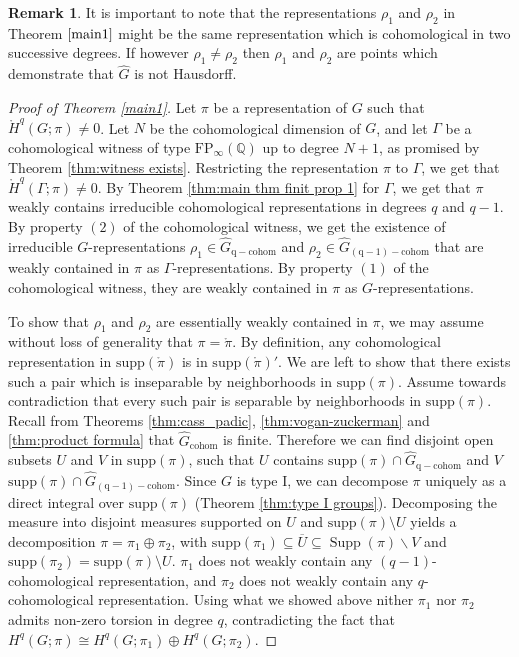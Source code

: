 \documentclass[12pt,reqno]{amsart}
\newcommand{\Q}{\mathbb{Q}}
\theoremstyle{definition}
\newtheorem{remark}[theorem]{Remark}
\newcommand{\supp}{\operatorname{Supp}}
\newcommand{\torH}{\mathring{H}}
\begin{document}
\begin{remark}
It is important to note that the representations $\rho_1$ and $\rho_2$ in Theorem $\ref{main1}$ might be the same representation which is cohomological in two successive degrees. If however $\rho_1 \neq \rho_2$ then $\rho_1$ and $\rho_2$ are points which demonstrate that $\widehat{G}$ is not Hausdorff. 
\end{remark}
\begin{proof}[Proof of Theorem \ref{main1}]
Let $\pi$ be a representation of $G$ such that $\torH^q(G;\pi) \ne 0$. Let $N$ be the cohomological dimension of $G$, and let $\Gamma$ be a cohomological witness of type $\mathrm{FP}_\infty(\Q)$ up to degree $N+1$, as promised by Theorem \ref{thm:witness exists}. Restricting the representation $\pi$ to $\Gamma$, we get that $\mathring{H}^q(\Gamma;\pi) \ne 0$. By Theorem \ref{thm:main thm finit prop 1} for $\Gamma$, we get that $\pi$ weakly contains irreducible cohomological representations in degrees $q$ and $q-1$. By property $(2)$ of the cohomological witness, we get the existence of irreducible $G$-representations $\rho_1\in \widehat{G}_{\mathrm{q-cohom}}$ and $\rho_2 \in \widehat{G}_{\mathrm{(q-1)-cohom}}$ that are weakly contained in $\pi$ as $\Gamma$-representations. By property $(1)$ of the cohomological witness, they are weakly contained in $\pi$ as $G$-representations. 

To show that $\rho_1$ and $\rho_2$ are essentially weakly contained in $\pi$, we may assume without loss of generality that $\pi=\mathring\pi$. By definition, any cohomological representation in $\mathrm{supp}(\mathring\pi)$ is in $\mathrm{supp}(\mathring\pi)'$. We are left to show that there exists such a pair which is inseparable by neighborhoods in $\mathrm{supp}(\pi)$. Assume towards contradiction that every such pair is separable by neighborhoods in $\mathrm{supp}(\pi)$. Recall from Theorems \ref{thm:cass_padic}, \ref{thm:vogan-zuckerman} and \ref{thm:product formula} that $\widehat{G}_\mathrm{cohom}$ is finite. Therefore we can find disjoint open subsets $U$ and $V$ in $\mathrm{supp}(\pi)$, such that $U$ contains $\mathrm{supp}(\pi)\cap\widehat{G}_{\mathrm{q-cohom}}$ and $V$ $\mathrm{supp}(\pi)\cap\widehat{G}_{\mathrm{(q-1)-cohom}}$. Since $G$ is type I, we can decompose $\pi$ uniquely as a direct integral over $\mathrm{supp}(\pi)$ (Theorem \ref{thm:type I groups}). Decomposing the measure into disjoint measures supported on $U$ and $\mathrm{supp}(\pi) \setminus U$ yields a decomposition $\pi=\pi_1 \oplus \pi_2$, with $\mathrm{supp}(\pi_1) \subseteq \overline{U} \subseteq \supp(\pi)\backslash V$ and $\mathrm{supp}(\pi_2)=\mathrm{supp}(\pi) \setminus U$. $\pi_1$ does not weakly contain any $(q-1)$-cohomological representation, and $\pi_2$ does not weakly contain any $q$-cohomological representation. Using what we showed above nither  $\pi_1$ nor $\pi_2$ admits non-zero torsion in degree $q$, contradicting the fact that $H^q(G;\pi) \cong H^q(G;\pi_1) \oplus H^q(G;\pi_2)$.
\end{proof}
\end{document}
